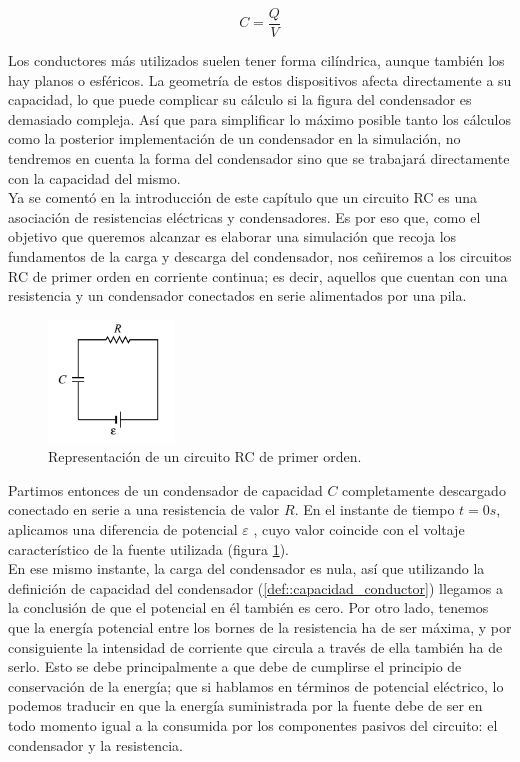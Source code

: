 \documentclass[../main.tex]{subfiles}
\begin{document}
\begin{equation}
    \label{def::capacidad_conductor}
    C = \frac{Q}{V}
\end{equation}

Los conductores más utilizados suelen tener forma cilíndrica, aunque también los hay planos o esféricos. La geometría de estos dispositivos afecta directamente a su capacidad, lo que puede complicar su cálculo si la figura del condensador es demasiado compleja. Así que para simplificar lo máximo posible tanto los cálculos como la posterior implementación de un condensador en la simulación, no tendremos en cuenta la forma del condensador sino que se trabajará directamente con la capacidad del mismo.\\ 

Ya se comentó en la introducción de este capítulo que un circuito RC es una asociación de resistencias eléctricas y condensadores. Es por eso que, como el objetivo que queremos alcanzar es elaborar una simulación que recoja los fundamentos de la carga y descarga del condensador, nos ceñiremos a los circuitos RC de primer orden en corriente continua; es decir, aquellos que cuentan con una resistencia y un condensador conectados en serie alimentados por una pila.\\ 

\begin{figure}[!h]
    \centering
    \includegraphics[width=0.3\textwidth]{images/Circuito_RC.png}
    \caption{Representación de un circuito RC de primer orden.}
    \label{fig::circuito_rc_representación}
\end{figure}

Partimos entonces de un condensador de capacidad $C$ completamente descargado conectado en serie a una resistencia de valor $R$. En el instante de tiempo $t=0s$, aplicamos una diferencia de potencial $\varepsilon$ , cuyo valor coincide con el voltaje característico de la fuente utilizada (figura \ref{fig::circuito_rc_representación}).\\


En ese mismo instante, la carga del condensador es nula, así que utilizando la definición de capacidad del condensador (\ref{def::capacidad_conductor}) llegamos a la conclusión de que el potencial en él también es cero. Por otro lado, tenemos que la energía potencial entre los bornes de la resistencia ha de ser máxima, y por consiguiente la intensidad de corriente que circula a través de ella también ha de serlo. Esto se debe principalmente a que debe de cumplirse el principio de conservación de la energía; que si hablamos en términos de potencial eléctrico, lo podemos traducir en que la energía suministrada por la fuente debe de ser en todo momento igual a la consumida por los componentes pasivos del circuito: el condensador y la resistencia.
\end{document}
